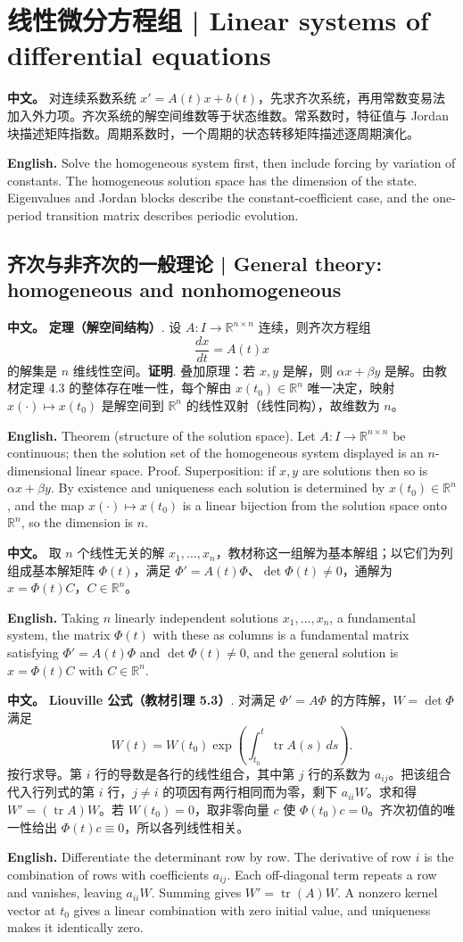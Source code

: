 \documentclass[UTF8,11pt,a4paper]{ctexart}
\newcommand{\APS}[2]{\par\noindent\textbf{中文。} #1\par\noindent\textbf{English.} #2\par}
\begin{document}
\section[线性微分方程组]{线性微分方程组 | Linear systems of differential equations}
\APS{对连续系数系统 $x'=A(t)x+b(t)$，先求齐次系统，再用常数变易法加入外力项。齐次系统的解空间维数等于状态维数。常系数时，特征值与 Jordan 块描述矩阵指数。周期系数时，一个周期的状态转移矩阵描述逐周期演化。}{Solve the homogeneous system first, then include forcing by variation of constants. The homogeneous solution space has the dimension of the state. Eigenvalues and Jordan blocks describe the constant-coefficient case, and the one-period transition matrix describes periodic evolution.}
\subsection{齐次与非齐次的一般理论 | General theory: homogeneous and nonhomogeneous}
\APS{\textbf{定理（解空间结构）}. 设 $A\colon I\to\mathbb R^{n\times n}$ 连续，则齐次方程组
\[
\frac{dx}{dt}=A(t)x
\]
的解集是 $n$ 维线性空间。\textbf{证明}. 叠加原理：若 $x,y$ 是解，则 $\alpha x+\beta y$ 是解。由教材定理 4.3 的整体存在唯一性，每个解由 $x(t_0)\in\mathbb R^n$ 唯一决定，映射 $x(\cdot)\mapsto x(t_0)$ 是解空间到 $\mathbb R^n$ 的线性双射（线性同构），故维数为 $n$。}{Theorem (structure of the solution space). Let $A\colon I\to\mathbb R^{n\times n}$ be continuous; then the solution set of the homogeneous system displayed is an $n$-dimensional linear space. Proof. Superposition: if $x,y$ are solutions then so is $\alpha x+\beta y$. By existence and uniqueness each solution is determined by $x(t_0)\in\mathbb R^n$, and the map $x(\cdot)\mapsto x(t_0)$ is a linear bijection from the solution space onto $\mathbb R^n$, so the dimension is $n$.}
\APS{取 $n$ 个线性无关的解 $x_1,\dots,x_n$，教材称这一组解为基本解组；以它们为列组成基本解矩阵 $\Phi(t)$，满足 $\Phi'=A(t)\Phi$、$\det\Phi(t)\ne0$，通解为 $x=\Phi(t)C$，$C\in\mathbb R^n$。}{Taking $n$ linearly independent solutions $x_1,\dots,x_n$, a fundamental system, the matrix $\Phi(t)$ with these as columns is a fundamental matrix satisfying $\Phi'=A(t)\Phi$ and $\det\Phi(t)\ne0$, and the general solution is $x=\Phi(t)C$ with $C\in\mathbb R^n$.}
\APS{\textbf{Liouville 公式（教材引理 5.3）}. 对满足 $\Phi'=A\Phi$ 的方阵解，$W=\det\Phi$ 满足
\[
W(t)=W(t_0)\exp\left(\int_{t_0}^t\operatorname{tr}A(s)\,ds\right).
\]
按行求导。第 $i$ 行的导数是各行的线性组合，其中第 $j$ 行的系数为 $a_{ij}$。把该组合代入行列式的第 $i$ 行，$j\ne i$ 的项因有两行相同而为零，剩下 $a_{ii}W$。求和得 $W'=(\operatorname{tr}A)W$。若 $W(t_0)=0$，取非零向量 $c$ 使 $\Phi(t_0)c=0$。齐次初值的唯一性给出 $\Phi(t)c\equiv0$，所以各列线性相关。}{Differentiate the determinant row by row. The derivative of row $i$ is the combination of rows with coefficients $a_{ij}$. Each off-diagonal term repeats a row and vanishes, leaving $a_{ii}W$. Summing gives $W'=\operatorname{tr}(A)W$. A nonzero kernel vector at $t_0$ gives a linear combination with zero initial value, and uniqueness makes it identically zero.}
\end{document}
